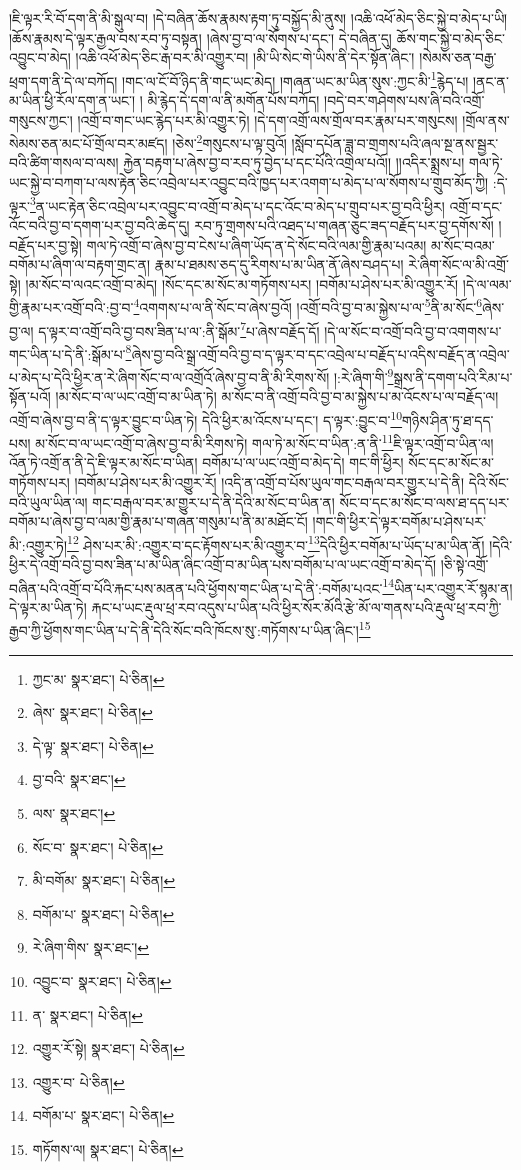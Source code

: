 །ཇི་ལྟར་རི་བོ་དག་ནི་མི་སྒུལ་བ། །དེ་བཞིན་ཆོས་རྣམས་རྟག་ཏུ་བསྐྱོད་མི་ནུས། །འཆི་འཕོ་མེད་ཅིང་སྐྱེ་བ་མེད་པ་ཡི། །ཆོས་རྣམས་དེ་ལྟར་རྒྱལ་བས་རབ་ཏུ་བསྟན། །ཞེས་བྱ་བ་ལ་སོགས་པ་དང་། དེ་བཞིན་དུ། ཆོས་གང་སྐྱེ་བ་མེད་ཅིང་འབྱུང་བ་མེད། །འཆི་འཕོ་མེད་ཅིང་རྒ་བར་མི་འགྱུར་བ། །མི་ཡི་སེང་གེ་ཡིས་ནི་དེར་སྟོན་ཞིང་། །སེམས་ཅན་བརྒྱ་ཕྲག་དག་ནི་དེ་ལ་བཀོད། །གང་ལ་ངོ་བོ་ཉིད་ནི་གང་ཡང་མེད། །གཞན་ཡང་མ་ཡིན་སུས་:ཀྱང་མི་\footnote{ཀྱང་མ་  སྣར་ཐང་།  པེ་ཅིན། }རྙེད་པ། །ནང་ན་མ་ཡིན་ཕྱི་རོལ་དག་ན་ཡང་། །
མི་རྙེད་དེ་དག་ལ་ནི་མགོན་པོས་བཀོད། །བདེ་བར་གཤེགས་པས་ཞི་བའི་འགྲོ་གསུངས་ཀྱང་། །འགྲོ་བ་གང་ཡང་རྙེད་པར་མི་འགྱུར་ཏེ། །དེ་དག་འགྲོ་ལས་གྲོལ་བར་རྣམ་པར་གསུངས། །གྲོལ་ནས་སེམས་ཅན་མང་པོ་གྲོལ་བར་མཛད། །ཅེས་\footnote{ཞེས་  སྣར་ཐང་།  པེ་ཅིན། }གསུངས་པ་ལྟ་བུའོ། །སློབ་དཔོན་ཟླ་བ་གྲགས་པའི་ཞལ་སྔ་ནས་སྦྱར་བའི་ཚིག་གསལ་བ་ལས། རྐྱེན་བརྟག་པ་ཞེས་བྱ་བ་རབ་ཏུ་བྱེད་པ་དང་པོའི་འགྲེལ་པའོ།། །།འདིར་སྨྲས་པ། གལ་ཏེ་ཡང་སྐྱེ་བ་བཀག་པ་ལས་རྟེན་ཅིང་འབྲེལ་པར་འབྱུང་བའི་ཁྱད་པར་འགག་པ་མེད་པ་ལ་སོགས་པ་གྲུབ་མོད་ཀྱི། :དེ་ལྟར་\footnote{དེ་ལྟ་  སྣར་ཐང་།  པེ་ཅིན། }ན་ཡང་རྟེན་ཅིང་འབྲེལ་པར་འབྱུང་བ་འགྲོ་བ་མེད་པ་དང་འོང་བ་མེད་པ་གྲུབ་པར་བྱ་བའི་ཕྱིར། འགྲོ་བ་དང་འོང་བའི་བྱ་བ་དགག་པར་བྱ་བའི་ཆེད་དུ། རབ་ཏུ་གྲགས་པའི་འཐད་པ་གཞན་ཅུང་ཟད་བརྗོད་པར་བྱ་དགོས་སོ། །བརྗོད་པར་བྱ་སྟེ། གལ་ཏེ་འགྲོ་བ་ཞེས་བྱ་བ་ངེས་པ་ཞིག་ཡོད་ན་དེ་སོང་བའི་ལམ་གྱི་རྣམ་པའམ། མ་སོང་བའམ་བགོམ་པ་ཞིག་ལ་བརྟག་གྲང་ན། རྣམ་པ་ཐམས་ཅད་དུ་རིགས་པ་མ་ཡིན་ནོ་ཞེས་བཤད་པ། རེ་ཞིག་སོང་ལ་མི་འགྲོ་སྟེ། །མ་སོང་བ་ལའང་འགྲོ་བ་མེད། །སོང་དང་མ་སོང་མ་གཏོགས་པར། །བགོམ་པ་ཤེས་པར་མི་འགྱུར་རོ། །དེ་ལ་ལམ་གྱི་རྣམ་པར་འགྲོ་བའི་:བྱ་བ་\footnote{བྱ་བའི་  སྣར་ཐང་། }འགགས་པ་ལ་ནི་སོང་བ་ཞེས་བྱའོ། །འགྲོ་བའི་བྱ་བ་མ་སྐྱེས་པ་ལ་\footnote{ལས་  སྣར་ཐང་། }ནི་མ་སོང་\footnote{སོང་བ་  སྣར་ཐང་།  པེ་ཅིན། }ཞེས་བྱ་ལ། ད་ལྟར་བ་འགྲོ་བའི་བྱ་བས་ཟིན་པ་ལ་:ནི་སྒོམ་\footnote{མི་བགོམ་  སྣར་ཐང་།  པེ་ཅིན། }པ་ཞེས་བརྗོད་དོ། །དེ་ལ་སོང་བ་འགྲོ་བའི་བྱ་བ་འགགས་པ་གང་ཡིན་པ་དེ་ནི་:སྒོམ་པ་\footnote{བགོམ་པ་  སྣར་ཐང་།  པེ་ཅིན། }ཞེས་བྱ་བའི་སྒྲ་འགྲོ་བའི་བྱ་བ་ད་ལྟར་བ་དང་འབྲེལ་པ་བརྗོད་པ་འདིས་བརྗོད་ན་འབྲེལ་པ་མེད་པ་དེའི་ཕྱིར་ན་རེ་ཞིག་སོང་བ་ལ་འགྲོའོ་ཞེས་བྱ་བ་ནི་མི་རིགས་སོ། །:རེ་ཞིག་གི་\footnote{རེ་ཞིག་གིས་  སྣར་ཐང་། }སྒྲས་ནི་དགག་པའི་རིམ་པ་སྟོན་པའོ། །མ་སོང་བ་ལ་ཡང་འགྲོ་བ་མ་ཡིན་ཏེ། མ་སོང་བ་ནི་འགྲོ་བའི་བྱ་བ་མ་སྐྱེས་པ་མ་འོངས་པ་ལ་བརྗོད་ལ། འགྲོ་བ་ཞེས་བྱ་བ་ནི་ད་ལྟར་བྱུང་བ་ཡིན་ཏེ། དེའི་ཕྱིར་མ་འོངས་པ་དང་། ད་ལྟར་:བྱུང་བ་\footnote{འབྱུང་བ་  སྣར་ཐང་།  པེ་ཅིན། }གཉིས་ཤིན་ཏུ་ཐ་དད་པས། མ་སོང་བ་ལ་ཡང་འགྲོ་བ་ཞེས་བྱ་བ་མི་རིགས་ཏེ། གལ་ཏེ་མ་སོང་བ་ཡིན་:ན་ནི་\footnote{ན་  སྣར་ཐང་།  པེ་ཅིན། }ཇི་ལྟར་འགྲོ་བ་ཡིན་ལ། འོན་ཏེ་འགྲོ་ན་ནི་དེ་ཇི་ལྟར་མ་སོང་བ་ཡིན། བགོམ་པ་ལ་ཡང་འགྲོ་བ་མེད་དེ། གང་གི་ཕྱིར། སོང་དང་མ་སོང་མ་གཏོགས་པར། །བགོམ་པ་ཤེས་པར་མི་འགྱུར་རོ། །འདི་ན་འགྲོ་བ་པོས་ཡུལ་གང་བརྒལ་བར་གྱུར་པ་དེ་ནི། དེའི་སོང་བའི་ཡུལ་ཡིན་ལ། གང་བརྒལ་བར་མ་གྱུར་པ་དེ་ནི་དེའི་མ་སོང་བ་ཡིན་ན། སོང་བ་དང་མ་སོང་བ་ལས་ཐ་དད་པར་བགོམ་པ་ཞེས་བྱ་བ་ལམ་གྱི་རྣམ་པ་གཞན་གསུམ་པ་ནི་མ་མཐོང་ངོ། །གང་གི་ཕྱིར་དེ་ལྟར་བགོམ་པ་ཤེས་པར་མི་:འགྱུར་ཏེ།\footnote{འགྱུར་རོ་སྟེ།  སྣར་ཐང་།  པེ་ཅིན། } ཤེས་པར་མི་:འགྱུར་བ་དང་རྟོགས་པར་མི་འགྱུར་བ་\footnote{འགྱུར་བ་  པེ་ཅིན། }དེའི་ཕྱིར་བགོམ་པ་ཡོད་པ་མ་ཡིན་ནོ། །དེའི་ཕྱིར་དེ་འགྲོ་བའི་བྱ་བས་ཟིན་པ་མ་ཡིན་ཞིང་འགྲོ་བ་མ་ཡིན་པས་བགོམ་པ་ལ་ཡང་འགྲོ་བ་མེད་དོ། །ཅི་སྟེ་འགྲོ་བཞིན་པའི་འགྲོ་བ་པོའི་རྐང་པས་མནན་པའི་ཕྱོགས་གང་ཡིན་པ་དེ་ནི་:བགོམ་པའང་\footnote{བགོམ་པ་  སྣར་ཐང་།  པེ་ཅིན། }ཡིན་པར་འགྱུར་རོ་སྙམ་ན། དེ་ལྟར་མ་ཡིན་ཏེ། རྐང་པ་ཡང་རྡུལ་ཕྲ་རབ་འདུས་པ་ཡིན་པའི་ཕྱིར་སོར་མོའི་རྩེ་མོ་ལ་གནས་པའི་རྡུལ་ཕྲ་རབ་ཀྱི་རྒྱབ་ཀྱི་ཕྱོགས་གང་ཡིན་པ་དེ་ནི་དེའི་སོང་བའི་ཁོངས་སུ་:གཏོགས་པ་ཡིན་ཞིང་།\footnote{གཏོགས་ལ།  སྣར་ཐང་།  པེ་ཅིན། } 